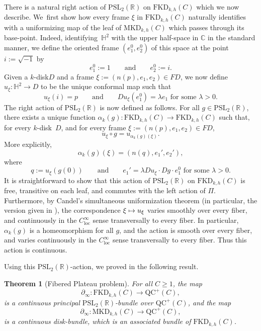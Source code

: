 \documentclass[JEP,XML,SOM,Unicode,NoEqCountersInSection,published]{cedram}
\newcommand\mto{\mathchoice{\longmapsto}{\mapsto}{\mapsto}{\mapsto}}
\newcommand{\kdisk}{$k$\nobreakdash-disk\xspace}
\theoremstyle{plain}
\newtheorem{theorem}{Theorem}[section]
\theoremstyle{definition}
\newcommand\PSL{\mathrm{PSL}_2(\mathbb{R})}
\newcommand\Hd{\mathbb{H}^2}
\newcommand{\C}{{\mathbb C}}
\newcommand{\loc}{\mathrm{loc}}
\newcommand{\QC}{\mathrm{QC}}
\newcommand{\MKD}{\mathrm{MKD}}
\newcommand{\FKD}{\mathrm{FKD}}
\newcommand{\bord}{\partial_{\infty}}
\begin{document}
There is a natural right action of $\PSL$ on $\FKD_{k,h}(C)$ which we now describe. We~first show how every frame $\xi$ in $\FKD_{k,h}(C)$ naturally identifies with a uniformizing map of the leaf of $\MKD_{k,h}(C)$ which passes through its base-point. Indeed, identifying~$\Hd$ with the upper half-space in $\C$ in the standard manner, we define the oriented frame $(e_1^0,e_2^0)$ of this space at the point $i:=\sqrt{-1}$ by
\begin{equation*}
e_1^0 := 1\qquad\text{and}\qquad e_2^0 := i.
\end{equation*}
Given a \kdisk $D$ and a frame $\xi:=(n(p),e_1,e_2)\in FD$, we now define $u_\xi:\Hd\to D$ to be the unique conformal map such that
\begin{equation*}
u_\xi(i)=p\qquad\text{and}\qquad Du_\xi(e_1^0)=\lambda e_1\,\,\text{for some }\lambda>0.
\end{equation*}
The right action of $\PSL$ is now defined as follows. For all $g\in\PSL$, there exists a unique function $\alpha_k(g):\FKD_{k,h}(C)\to\FKD_{k,h}(C)$ such that, for every \kdisk~$D$, and for every frame $\xi:=(n(p),e_1,e_2)\in FD$,
\begin{equation*}
u_\xi\circ g = u_{\alpha_k(g)(\xi)}.
\end{equation*}
More explicitly,
\begin{equation*}
\alpha_k(g)(\xi) = (n(q),e_1',e_2'),
\end{equation*}
where
\begin{equation*}
q := u_\xi(g(0))\qquad\text{and}\qquad e_1'=\lambda Du_\xi\cdot Dg\cdot e_1^0\,\,\text{for some }\lambda>0.
\end{equation*}
It is straightforward to show that this action of $\PSL$ on $\FKD_{k,h}(C)$ is free, transitive on each leaf, and commutes with the left action of $\Pi$. Furthermore, by Candel's simultaneous uniformization theorem (in particular, the version given in \cite[Th.\,2.7]{AlvarezSmith}), the correspondence $\xi\mto u_\xi$ varies smoothly over every fiber, and continuously in the $C^\infty_\loc$ sense transversally to every fiber. In particular, $\alpha_k(g)$ is a homeomorphism for all $g$, and the action is smooth over every fiber, and varies continuously in the $C^\infty_\loc$ sense transversally to every fiber. Thus this action is continuous.

Using this $\PSL$-action, we proved in \cite[Th.\,3.1.2. \& 3.2.2]{ALS} the following result.

\begin{theorem}[Fibered Plateau problem]\label{t.fibered_PP}
For all $C\geq 1$, the map
\begin{equation*}
\bord :\FKD_{k,h}(C)\to\QC^+(C),
\end{equation*}
is a continuous principal $\PSL$-bundle over $\QC^+(C)$, and the map
\begin{equation*}
\bord :\MKD_{k,h}(C)\to\QC^+(C),
\end{equation*}
is a continuous disk-bundle, which is an associated bundle of $\FKD_{k,h}(C)$.
\end{theorem}
\end{document}
